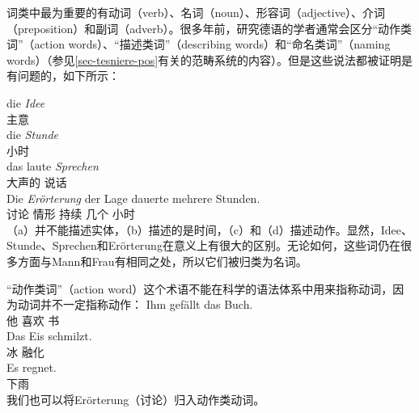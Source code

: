 词类中最为重要的有动词（verb）、名词（noun）、形容词（adjective）、介词（preposition）和副词（adverb）。很多年前，研究德语的学者通常会区分“动作类词”（action words）、“描述类词”（describing words）和“命名类词”（naming words）（参见\ref{sec-tesniere-pos}有关\tesc 的范畴系统的内容）。但是这些说法都被证明是有问题的，如下所示：

\eal
\ex 
\gll die \emph{Idee}\\
	 主意\\
\ex 
\gll die \emph{Stunde}\\
	  小时\\
\ex 
\gll das laute \emph{Sprechen}\\
      大声的 说话\\
\ex 
\gll Die \emph{Erörterung} der Lage dauerte mehrere Stunden.\\
      讨论  情形 持续 几个 小时\\
\zl
（a）并不能描述实体，（b）描述的是时间，（c）和（d）描述动作。显然，Idee、Stunde、Sprechen和Erörterung在意义上有很大的区别。无论如何，这些词仍在很多方面与Mann和Frau有相同之处，所以它们被归类为名词。

“动作类词”（action word）这个术语不能在科学的语法体系中用来指称动词，因为动词并不一定指称动作：
\eal
\ex
\gll Ihm gefällt das Buch.\\
	 他 喜欢  书\\
\ex 
\gll Das Eis schmilzt.\\
	  冰  融化\\
\ex 
\gll Es regnet.\\
	 \expl{} 下雨\\
\zl
我们也可以将Erörterung（讨论）归入动作类动词。

